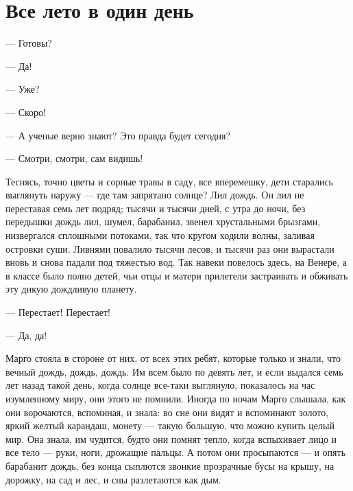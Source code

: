  
 
 
 
 

\section{Все лето в один день}
\label{sec:books.bredberi_rej.rasskazy.vse_leto_v_odin_den}

— Готовы?

— Да!

— Уже?

— Скоро!

— А ученые верно знают? Это правда будет сегодня?

— Смотри, смотри, сам видишь!

Теснясь, точно цветы и сорные травы в саду, все вперемешку, дети старались
выглянуть наружу — где там запрятано солнце? Лил дождь. Он лил не переставая
семь лет подряд; тысячи и тысячи дней, с утра до ночи, без передышки дождь лил,
шумел, барабанил, звенел хрустальными брызгами, низвергался сплошными потоками,
так что кругом ходили волны, заливая островки суши. Ливнями повалило тысячи
лесов, и тысячи раз они вырастали вновь и снова падали под тяжестью вод. Так
навеки повелось здесь, на Венере, а в классе было полно детей, чьи отцы и
матери прилетели застраивать и обживать эту дикую дождливую планету.

— Перестает! Перестает!

— Да, да!

Марго стояла в стороне от них, от всех этих ребят, которые только и знали, что
вечный дождь, дождь, дождь. Им всем было по девять лет, и если выдался семь лет
назад такой день, когда солнце все-таки выглянуло, показалось на час
изумленному миру, они этого не помнили. Иногда по ночам Марго слышала, как они
ворочаются, вспоминая, и знала: во сне они видят и вспоминают золото, яркий
желтый карандаш, монету — такую большую, что можно купить целый мир. Она знала,
им чудится, будто они помнят тепло, когда вспыхивает лицо и все тело — руки,
ноги, дрожащие пальцы. А потом они просыпаются — и опять барабанит дождь, без
конца сыплются звонкие прозрачные бусы на крышу, на дорожку, на сад и лес, и
сны разлетаются как дым.

